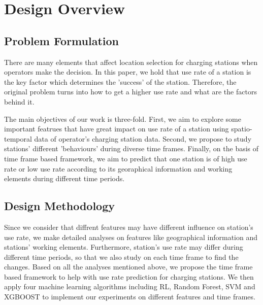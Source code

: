 \documentclass[conference]{IEEEtran}
\begin{document}
\section{Design Overview}
\subsection{Problem Formulation}
There are many elements that affect location selection for charging stations when operators make the decision. In this paper, we hold that use rate of a station is the key factor which determines the 'success' of the station. Therefore, the original problem turns into how to get a higher use rate and what are the factors behind it. 

The main objectives of our work is three-fold. First, we aim to explore some important featrues that have great impact on use rate of a station using spatio-temporal data of operator's charging station data. Second, we propose to study stations' different 'behaviours' during diverse time frames. Finally, on the basis of time frame based framework, we aim to predict that one station is of high use rate or low use rate according to its georaphical information and working elements during different time periods.

\subsection{Design Methodology}
Since we consider that diffrent features may have different influence on station's use rate, we make detailed analyses on features like geographical information and stations' working elements. Furthermore, station's use rate may differ during different time periods, so that we also study on each time frame to find the changes. Based on all the analyses mentioned above, we propose the time frame based framework to help with use rate prediction for charging stations. We then apply four machine learning algorithms including RL, Random Forest, SVM and XGBOOST to implement our experiments on different features and time frames.
\end{document}

